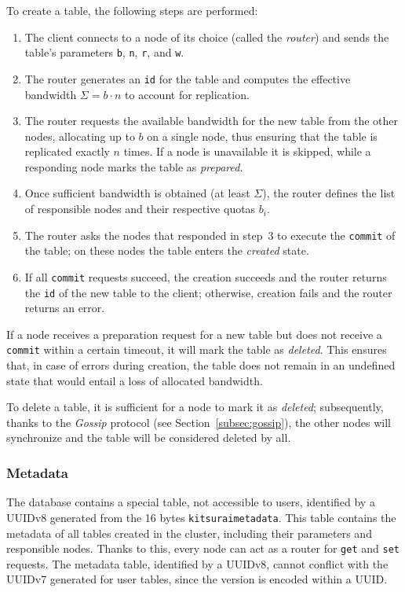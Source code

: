 To create a table, the following steps are performed:
\begin{enumerate}
    \item The client connects to a node of its choice (called the \emph{router}) and sends the table's parameters \texttt{b}, \texttt{n}, \texttt{r}, and \texttt{w}.
    \item The router generates an \texttt{id} for the table and computes the effective bandwidth $\Sigma = b \cdot n$ to account for replication.
    \item The router requests the available bandwidth for the new table from the other nodes, allocating up to $b$ on a single node, thus ensuring that the table is replicated exactly $n$ times.
    If a node is unavailable it is skipped, while a responding node marks the table as \emph{prepared}.
    \item Once sufficient bandwidth is obtained (at least $\Sigma$), the router defines the list of responsible nodes and their respective quotas $b_i$.
    \item The router asks the nodes that responded in step~3 to execute the \texttt{commit} of the table; on these nodes the table enters the \emph{created} state.
    \item If all \texttt{commit} requests succeed, the creation succeeds and the router returns the \texttt{id} of the new table to the client; otherwise, creation fails and the router returns an error.
\end{enumerate}

If a node receives a preparation request for a new table but does not receive a \texttt{commit} within a certain timeout, it will mark the table as \emph{deleted}.
This ensures that, in case of errors during creation, the table does not remain in an undefined state that would entail a loss of allocated bandwidth.

To delete a table, it is sufficient for a node to mark it as \emph{deleted}; subsequently, thanks to the \emph{Gossip} protocol (see Section~\ref{subsec:gossip}), the other nodes will synchronize and the table will be considered deleted by all.

\subsubsection{Metadata}
\label{subsubsec:metadata}

The database contains a special table, not accessible to users, identified by a UUIDv8 generated from the 16 bytes \texttt{kitsuraimetadata}.
This table contains the metadata of all tables created in the cluster, including their parameters and responsible nodes.
Thanks to this, every node can act as a router for \texttt{get} and \texttt{set} requests.
The metadata table, identified by a UUIDv8, cannot conflict with the UUIDv7 generated for user tables, since the version is encoded within a UUID\@.

